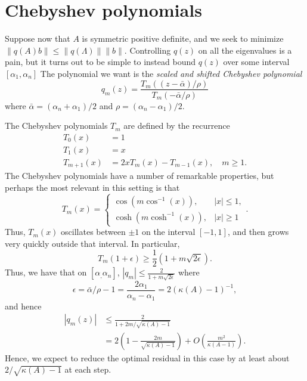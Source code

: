 \section{Chebyshev polynomials}

Suppose now that $A$ is symmetric positive definite, and we seek to
minimize $\|q(A) b\| \leq \|q(\Lambda)\| \|b\|$.  Controlling $q(z)$
on all the eigenvalues is a pain, but it turns out to be simple to
instead bound $q(z)$ over some interval $[\alpha_1, \alpha_n]$
The polynomial we want is the {\em scaled and shifted Chebyshev polynomial}
\[
  q_m(z) =
  \frac{T_m\left( (z-\bar{\alpha})/\rho \right)}
       {T_m\left( -\bar{\alpha}/\rho \right)}
\]
where $\bar{\alpha} = (\alpha_n + \alpha_1)/2$ and
$\rho = (\alpha_n-\alpha_1)/2$.

The Chebyshev polynomials $T_m$ are defined by the recurrence
\begin{align*}
  T_0(x) &= 1 \\
  T_1(x) &= x \\
  T_{m+1}(x) &= 2x T_m(x) - T_{m-1}(x), \quad m \geq 1.
\end{align*}
The Chebyshev polynomials have a number of remarkable properties, but
perhaps the most relevant in this setting is that
\[
  T_m(x) =
  \begin{cases}
    \cos(m \cos^{-1}(x)), & |x| \leq 1, \\
    \cosh(m \cosh^{-1}(x)), &|x| \geq 1
  \end{cases}.
\]
Thus, $T_m(x)$ oscillates between $\pm 1$ on the interval $[-1,1]$,
and then grows very quickly outside that interval.  In particular,
\[
  T_{m}(1 + \epsilon) \geq \frac{1}{2} (1+m\sqrt{2\epsilon}).
\]
Thus, we have that on $[\alpha_, \alpha_n]$,
$|q_m| \leq \frac{2}{1+m\sqrt{2\epsilon}}$
where
\[
  \epsilon = \bar{\alpha}/\rho-1
  = \frac{2\alpha_1}{\alpha_n-\alpha_1}
  = 2 \left( \kappa(A)-1 \right)^{-1},
\]
and hence
\begin{align*}
  |q_m(z)|
  &\leq \frac{2}{1+2m/\sqrt{\kappa(A)-1}} \\
  &= 2\left( 1- \frac{2m}{\sqrt{\kappa(A)-1}}\right) + O\left(\frac{m^2}{\kappa(A-1)}\right).
\end{align*}
Hence, we expect to reduce the optimal residual in this case
by at least about $2/\sqrt{\kappa(A)-1}$ at each step.
